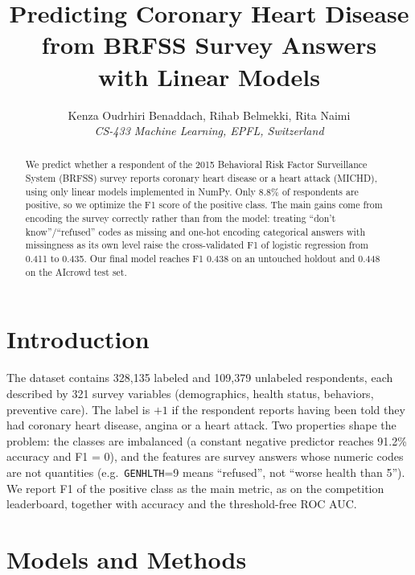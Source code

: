 \documentclass[10pt,conference,compsocconf]{IEEEtran}
\begin{document}
\title{Predicting Coronary Heart Disease from BRFSS Survey Answers\\with Linear Models}

\author{
  Kenza Oudrhiri Benaddach, Rihab Belmekki, Rita Naimi\\
  \textit{CS-433 Machine Learning, EPFL, Switzerland}
}

\maketitle

\begin{abstract}
We predict whether a respondent of the 2015 Behavioral Risk Factor
Surveillance System (BRFSS) survey reports coronary heart disease or a heart
attack (MICHD), using only linear models implemented in NumPy. Only 8.8\% of
respondents are positive, so we optimize the F1 score of the positive class.
The main gains come from encoding the survey correctly rather than from the
model: treating ``don't know''/``refused'' codes as missing and one-hot
encoding categorical answers with missingness as its own level raise the
cross-validated F1 of logistic regression from 0.411 to 0.435. Our final model
reaches F1 0.438 on an untouched holdout and 0.448 on the AIcrowd test set.
\end{abstract}

\section{Introduction}

The dataset contains 328,135 labeled and 109,379 unlabeled respondents, each
described by 321 survey variables (demographics, health status, behaviors,
preventive care). The label is $+1$ if the respondent reports having been told
they had coronary heart disease, angina or a heart attack. Two properties shape
the problem: the classes are imbalanced (a constant negative predictor reaches
91.2\% accuracy and F1 = 0), and the features are survey answers whose numeric
codes are not quantities (e.g.\ \texttt{GENHLTH}=9 means ``refused'', not
``worse health than 5''). We report F1 of the positive class as the main
metric, as on the competition leaderboard, together with accuracy and the
threshold-free ROC AUC.

\section{Models and Methods}
\end{document}
